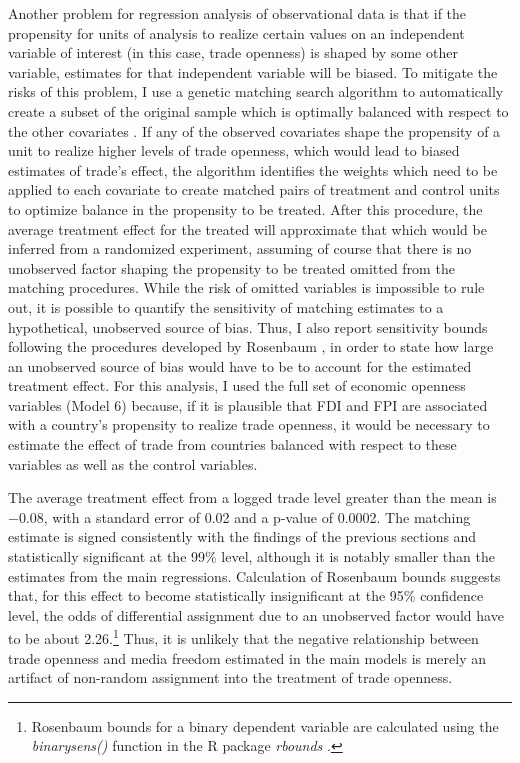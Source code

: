 \documentclass[12pt,a4paper]{article}\usepackage[]{graphicx}\usepackage[]{color}
\begin{document}
Another problem for regression analysis of observational data is that if the propensity for units of analysis to realize certain values on an independent variable of interest (in this case, trade openness) is shaped by some other variable, estimates for that independent variable will be biased. To mitigate the risks of this problem, I use a genetic matching search algorithm to automatically create a subset of the original sample which is optimally balanced with respect to the other covariates \parencites{Diamond:2012jo}{Sekhon:2008wd}. If any of the observed covariates shape the propensity of a unit to realize higher levels of trade openness, which would lead to biased estimates of trade's effect, the algorithm identifies the weights which need to be applied to each covariate to create matched pairs of treatment and control units to optimize balance in the propensity to be treated. After this procedure, the average treatment effect for the treated will approximate that which would be inferred from a randomized experiment, assuming of course that there is no unobserved factor shaping the propensity to be treated omitted from the matching procedures. While the risk of omitted variables is impossible to rule out, it is possible to quantify the sensitivity of matching estimates to a hypothetical, unobserved source of bias. Thus, I also report sensitivity bounds following the procedures developed by Rosenbaum \parencite*{Rosenbaum:1988fl}, in order to state how large an unobserved source of bias would have to be to account for the estimated treatment effect. For this analysis, I used the full set of economic openness variables (Model 6) because, if it is plausible that FDI and FPI are associated with a country's propensity to realize trade openness, it would be necessary to estimate the effect of trade from countries balanced with respect to these variables as well as the control variables.

The average treatment effect from a logged trade level greater than the mean is \ensuremath{-0.08}, with a standard error of 0.02 and a p-value of 0.0002. The matching estimate is signed consistently with the findings of the previous sections and statistically significant at the 99\% level, although it is notably smaller than the estimates from the main regressions. Calculation of Rosenbaum bounds suggests that, for this effect to become statistically insignificant at the 95\% confidence level, the odds of differential assignment due to an unobserved factor would have to be about 2.26.\footnote{Rosenbaum bounds for a binary dependent variable are calculated using the \emph{binarysens()} function in the R package \emph{rbounds} \parencite{rboundsPerformRos:2014vj}.} Thus, it is unlikely that the negative relationship between trade openness and media freedom estimated in the main models is merely an artifact of non-random assignment into the treatment of trade openness.
\end{document}
